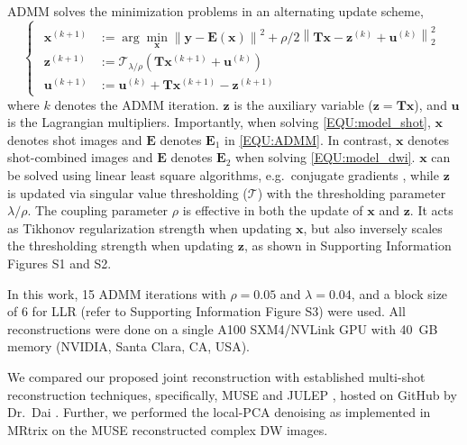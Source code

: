 \documentclass[preprint,12pt,authoryear,review]{elsarticle}
\newcommand*{\norm}[1]{\left\lVert#1\right\rVert}
\newcommand{\argmin}{\arg\!\min}
\begin{document}
    ADMM solves the minimization problems in an alternating update scheme,
    \begin{equation}
        \left\{\begin{matrix}
            \begin{aligned}
                \mathbf{x}^{(k+1)} &:= \argmin_{\mathbf{x}} \norm{\mathbf{y} - \mathbf{E}(\mathbf{x})}^2 + \rho/2 \norm{\mathbf{T}\mathbf{x} - \mathbf{z}^{(k)} + \mathbf{u}^{(k)}}_2^2 \\
                \mathbf{z}^{(k+1)} &:= \mathcal{T}_{\lambda/\rho} (\mathbf{T} \mathbf{x}^{(k+1)} + \mathbf{u}^{(k)}) \\
                \mathbf{u}^{(k+1)} &:= \mathbf{u}^{(k)} + \mathbf{T} \mathbf{x}^{(k+1)} - \mathbf{z}^{(k+1)}
            \end{aligned}
        \end{matrix}\right.
        \label{EQU:ADMM}
    \end{equation}
    where $k$ denotes the ADMM iteration.
    $\mathbf{z}$ is the auxiliary variable ($\mathbf{z} = \mathbf{T}\mathbf{x}$),
    and $\textbf{u}$ is the Lagrangian multipliers.
    Importantly, when solving \cref{EQU:model_shot},
    $\textbf{x}$ denotes shot images and $\mathbf{E}$ denotes $\mathbf{E}_1$ in \cref{EQU:ADMM}.
    In contrast, $\textbf{x}$ denotes shot-combined images and $\mathbf{E}$ denotes $\mathbf{E}_2$
    when solving \cref{EQU:model_dwi}.
    $\mathbf{x}$ can be solved using linear least square algorithms,
    e.g.~conjugate gradients \citep{hestenes_1952_cg},
    while $\mathbf{z}$ is updated via singular value thresholding
    ($\mathcal{T}$) with the thresholding parameter $\lambda / \rho$.
    The coupling parameter $\rho$ is effective in both the update of $\mathbf{x}$ and $\mathbf{z}$.
    It acts as Tikhonov regularization strength when updating $\mathbf{x}$,
    but also inversely scales the thresholding strength when updating $\mathbf{z}$,
    as shown in Supporting Information Figures S1 and S2.

    In this work, 15 ADMM iterations with $\rho = 0.05$ and $\lambda = 0.04$,
    and a block size of 6 for LLR (refer to Supporting Information Figure S3)
    were used.
    All reconstructions were done on a single A100 SXM4/NVLink GPU
    with \SI{40}{GB} memory (NVIDIA, Santa Clara, CA, USA).

    We compared our proposed joint reconstruction
    with established multi-shot reconstruction techniques,
    specifically, MUSE \citep{chen_2013_muse}
    and JULEP \citep{dai_2023_julep},
    hosted on GitHub by Dr.~Dai \citep{dai_2023_julep}.
    Further, we performed
    the local-PCA denoising \citep{cordero_2019_cplxdwi}
    as implemented in MRtrix \citep{Tournier_2019_mrtrix}
    on the MUSE reconstructed complex DW images.
\end{document}
